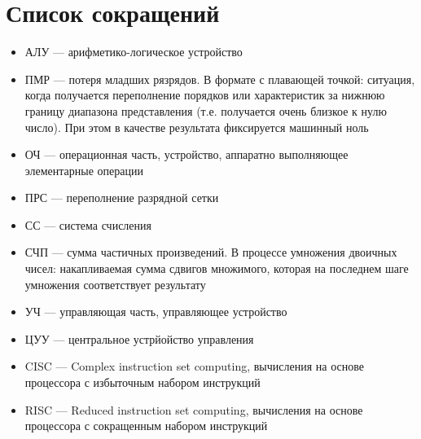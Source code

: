 \chapter*{Список сокращений}

\begin{itemize}
    \item АЛУ --- арифметико-логическое устройство
    \item ПМР --- потеря младших рязрядов. В формате с плавающей точкой: ситуация, когда получается переполнение порядков или характеристик за нижнюю границу диапазона представления (т.е. получается очень близкое к нулю число). При этом в качестве результата фиксируется машинный ноль
    \item ОЧ --- операционная часть, устройство, аппаратно выполняющее элементарные операции
    \item ПРС --- переполнение разрядной сетки
    \item СС --- система счисления
    \item СЧП --- сумма частичных произведений. В процессе умножения двоичных чисел: накапливаемая сумма сдвигов множимого, которая на последнем шаге умножения соответствует результату
    \item УЧ --- управляющая часть, управляющее устройство
    \item ЦУУ --- центральное устрйойство управления
    \item CISC --- Complex instruction set computing, вычисления на основе процессора с избыточным набором инструкций
    \item RISC --- Reduced instruction set computing, вычисления на основе процессора с сокращенным набором инструкций
\end{itemize}
